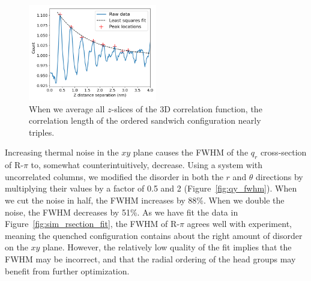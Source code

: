 \documentclass[journal=jpcbfk,manuscript=article]{achemso}
\begin{document}
  \begin{figure}
  \centering
  \includegraphics[width=0.5\textwidth]{z_correlation_fullbox.png}
  \caption{When we average all $z$-slices of the 3D correlation function, the 
  correlation length of the ordered sandwich configuration nearly triples.}\label{fig:z_correlation_fullbox}
  \end{figure}
 
  Increasing thermal noise in the $xy$ plane causes the FWHM of the $q_r$
  cross-section of R-$\pi$ to, somewhat counterintuitively, decrease. Using a 
  system with uncorrelated columns, we modified the disorder in both the $r$ and
  $\theta$ directions by multiplying their values by a factor of 0.5 and 2 
  (Figure~\ref{fig:qy_fwhm}). When we cut the noise in half, the FWHM increases
  by 88\%. When we double the noise, the FWHM decreases by 51\%. As we have fit
  the data in Figure~\ref{fig:sim_rsection_fit}, the FWHM of R-$\pi$ agrees
  well with experiment, meaning the quenched configuration contains about the
  right amount of disorder on the $xy$ plane. However, the relatively low quality
  of the fit implies that the FWHM may be incorrect, and that the radial ordering
  of the head groups may benefit from further optimization.
\end{document}
